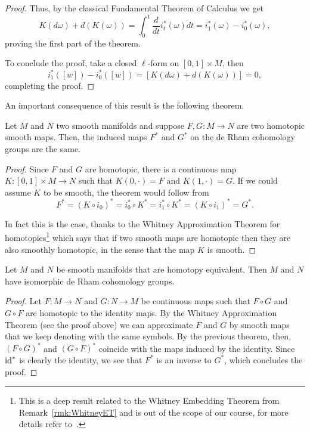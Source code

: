 \begin{proof}
  Thus, by the classical Fundamental Theorem of Calculus we get
  \begin{equation}
  K(d\omega) + d(K(\omega)) = \int_0^1 \frac{d}{dt} i_t^*(\omega) dt = i_1^*(\omega) - i_0^*(\omega),
  \end{equation}
  proving the first part of the theorem.

  To conclude the proof, take a closed $\ell$-form on $[0,1]\times M$, then
  \begin{equation}
    i_1^*([w]) - i_0^*([w]) = [K(d\omega) + d(K(\omega))] = 0,
  \end{equation}
  completing the proof.
\end{proof}

An important consequence of this result is the following theorem.

\begin{theorem}
Let $M$ and $N$ two smooth manifolds and suppose $F,G: M\to N$ are two homotopic smooth maps.
Then, the induced maps $F^*$ and $G^*$ on the de Rham cohomology groups are the same.
\end{theorem}
\begin{proof}
Since $F$ and $G$ are homotopic, there is a continuous map $K: [0,1]\times M \to N$ such that $K(0,\cdot) = F$ and $K(1,\cdot) = G$.
If we could assume $K$ to be smooth, the theorem would follow from
\begin{equation}
  F^* = (K\circ i_0)^* = i_0^*\circ K^* = i_1^*\circ K^* = (K\circ i_1)^* = G^*.
\end{equation}

In fact this is the case, thanks to the Whitney Approximation Theorem for homotopies\footnote{This is a deep result related to the Whitney Embedding Theorem from Remark~\ref{rmk:WhitneyET} and is out of the scope of our course, for more details refer to~\cite[Chapter 6 and Theorems 6.26 and 9.27]{book:lee}.} which says that if two smooth maps are homotopic then they are also smoothly homotopic, in the sense that the map $K$ is smooth.
\end{proof}

\begin{corollary}\label{cor:deRhamIso}
  Let $M$ and $N$ be smooth manifolds that are homotopy equivalent. Then $M$ and $N$ have isomorphic de Rham cohomology groups.
\end{corollary}
\begin{proof}
  Let $F:M\to N$ and $G:N\to M$ be continuous maps such that $F\circ G$ and $G\circ F$ are homotopic to the identity maps. 
  By the Whitney Approximation Theorem (see the proof above) we can approximate $F$ and $G$ by smooth maps that we keep denoting with the same symbols.
  By the previous theorem, then, $(F\circ G)^*$ and $(G\circ F)^*$ coincide with the maps induced by the identity.
  Since $\operatorname{id}^*$ is clearly the identity, we see that $F^*$ is an inverse to $G^*$, which concludes the proof.
\end{proof}

